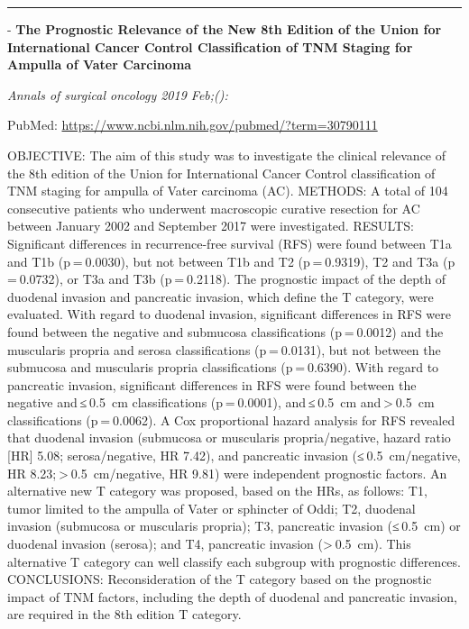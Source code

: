 \documentclass[]{article}
\begin{document}
\begin{center}\rule{0.5\linewidth}{\linethickness}\end{center}

 - \textbf{The Prognostic Relevance of the New 8th Edition of the Union
for International Cancer Control Classification of TNM Staging for
Ampulla of Vater Carcinoma}

\emph{Annals of surgical oncology 2019 Feb;():}

PubMed: \url{https://www.ncbi.nlm.nih.gov/pubmed/?term=30790111}

OBJECTIVE: The aim of this study was to investigate the clinical
relevance of the 8th edition of the Union for International Cancer
Control classification of TNM staging for ampulla of Vater carcinoma
(AC). METHODS: A total of 104 consecutive patients who underwent
macroscopic curative resection for AC between January 2002 and September
2017 were investigated. RESULTS: Significant differences in
recurrence-free survival (RFS) were found between T1a and T1b
(p = 0.0030), but not between T1b and T2 (p = 0.9319), T2 and T3a
(p = 0.0732), or T3a and T3b (p = 0.2118). The prognostic impact of the
depth of duodenal invasion and pancreatic invasion, which define the T
category, were evaluated. With regard to duodenal invasion, significant
differences in RFS were found between the negative and submucosa
classifications (p = 0.0012) and the muscularis propria and serosa
classifications (p = 0.0131), but not between the submucosa and
muscularis propria classifications (p = 0.6390). With regard to
pancreatic invasion, significant differences in RFS were found between
the negative and ≤ 0.5~cm classifications (p = 0.0001), and ≤ 0.5~cm
and \textgreater{} 0.5~cm classifications (p = 0.0062). A Cox
proportional hazard analysis for RFS revealed that duodenal invasion
(submucosa or muscularis propria/negative, hazard ratio {[}HR{]} 5.08;
serosa/negative, HR 7.42), and pancreatic invasion (≤ 0.5~cm/negative,
HR 8.23; \textgreater{} 0.5~cm/negative, HR 9.81) were independent
prognostic factors. An alternative new T category was proposed, based on
the HRs, as follows: T1, tumor limited to the ampulla of Vater or
sphincter of Oddi; T2, duodenal invasion (submucosa or muscularis
propria); T3, pancreatic invasion (≤ 0.5~cm) or duodenal invasion
(serosa); and T4, pancreatic invasion (\textgreater{} 0.5~cm). This
alternative T category can well classify each subgroup with prognostic
differences. CONCLUSIONS: Reconsideration of the T category based on the
prognostic impact of TNM factors, including the depth of duodenal and
pancreatic invasion, are required in the 8th edition T category.
\end{document}
